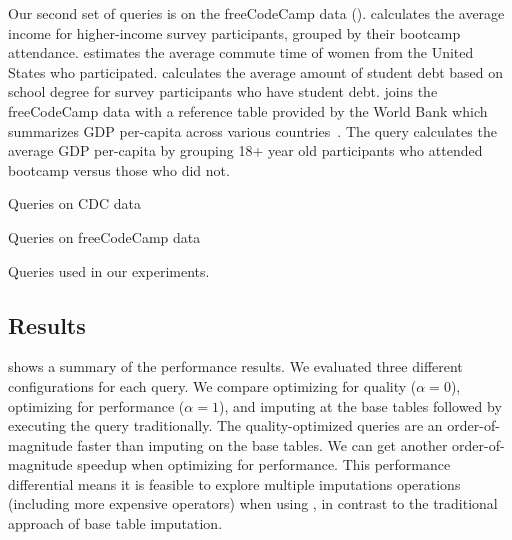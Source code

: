 Our second set of queries is on the freeCodeCamp data ().
 calculates the average income for higher-income survey participants, grouped by their bootcamp attendance.
 estimates the average commute time of women from the United States who participated.
 calculates the average amount of student debt based on school degree for survey participants who have student debt.
 joins the freeCodeCamp data with a reference table provided by the World Bank which summarizes GDP per-capita across various countries~\cite{worldbank-data}.
The query calculates the average GDP per-capita by grouping 18+ year old participants who attended bootcamp versus those who did not.

\begin{table}
  \centering
  \begin{subtable}{\linewidth}
    
    \caption{Queries on CDC data}\label{fig:queries-cdc}
  \end{subtable}
  \par\medskip
  \begin{subtable}{\linewidth}
    
    \caption{Queries on freeCodeCamp data}\label{fig:queries-fcc}
  \end{subtable}
  \par\medskip
  \caption{Queries used in our experiments.}\label{fig:queries}
\end{table}

%  

\subsection{Results}\label{sec:results}





 shows a summary of the performance results. We evaluated three different
configurations for each query. We compare \ProjectName{} optimizing for quality ($\alpha=0$),
\ProjectName{} optimizing for performance ($\alpha=1$), and imputing at the base tables followed
by executing the query traditionally. The quality-optimized queries are an order-of-magnitude
faster than imputing on the base tables. We can get another order-of-magnitude speedup when
optimizing for performance. This performance differential means it is feasible
to explore multiple imputations operations (including more expensive operators) when using
\ProjectName{}, in contrast to the traditional approach of base table imputation.

